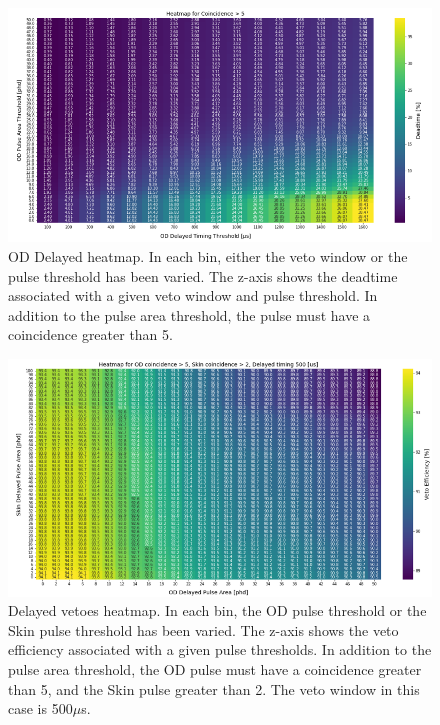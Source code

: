 \begin{figure}
 \centering
 \includegraphics[width=\textwidth]{figures/VetoEfficiency/HeatMapOD_PA_ScanWindow_deadtime.png}
 \caption{OD Delayed heatmap.
 In each bin, either the veto window or the pulse threshold has been varied.
 The z-axis shows the deadtime associated with a given veto window and pulse threshold.
 In addition to the pulse area threshold, the pulse must have a coincidence greater than 5.}
 \label{fig:od_delayed_veto_heatmap}
\end{figure}
\begin{figure}{\textwidth}
 \centering
 \includegraphics[width=\textwidth]{figures/VetoEfficiency/HeatMap_ODPA_SkinPA_eff.png}
 \caption{Delayed vetoes heatmap.
 In each bin, the OD pulse threshold or the Skin pulse threshold has been varied.
 The z-axis shows the veto efficiency associated with a given pulse thresholds.
 In addition to the pulse area threshold, the OD pulse must have a coincidence greater than 5, and the Skin pulse greater than 2.
 The veto window in this case is 500$\mu$s.}
 \label{fig:skin_delayed_veto_heatmap}
\end{figure}


